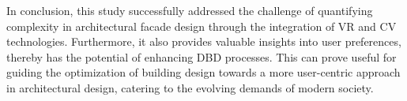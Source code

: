 In conclusion, this study successfully addressed the challenge of quantifying complexity in architectural facade design through the integration of VR and CV technologies.
Furthermore, it also provides valuable insights into user preferences, thereby has the potential of enhancing DBD processes.
This can prove useful for guiding the optimization of building design towards a more user-centric approach in architectural design, catering to the evolving demands of modern society.